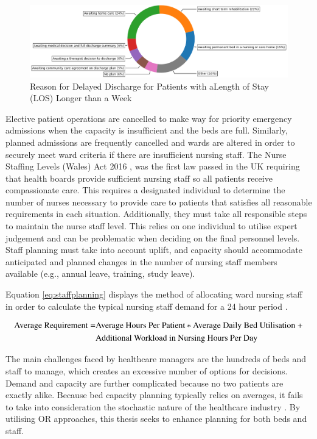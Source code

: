 \documentclass[../thesis.tex]{subfiles}
\begin{document}
\begin{figure}[h!]
    \centering
    \includegraphics[scale=0.7]{Chapters/Chapter1/Figures/piechart.png}
    \caption{Reason for Delayed Discharge for Patients with aLength of Stay (LOS) Longer than a Week \cite{NuffieldTrust2022}}
    \label{fig:Piechartdelays}
\end{figure}

Elective patient operations are cancelled to make way for priority emergency admissions when the capacity is insufficient and the beds are full. Similarly, planned admissions are frequently cancelled and wards are altered in order to securely meet ward criteria if there are insufficient nursing staff. The Nurse Staffing Levels (Wales) Act 2016 \cite{NHSAct2006}, was the first law passed in the UK requiring that health boards provide sufficient nursing staff so all patients receive compassionate care. This requires a designated individual to determine the number of nurses necessary to provide care to patients that satisfies all reasonable requirements in each situation. Additionally, they must take all responsible steps to maintain the nurse staff level. This relies on one individual to utilise expert judgement and can be problematic when deciding on the final personnel levels. Staff planning must take into account uplift, and capacity should accommodate anticipated and planned changes in the number of nursing staff members available (e.g., annual leave, training, study leave).

Equation \ref{eq:staffplanning} displays the method of allocating ward nursing staff in order to calculate the typical nursing staff demand for a 24 hour period \cite{NIHCE2014}. 

\begin{align}\label{eq:staffplanning}
    \text{Average Requirement} =& \text{Average Hours Per Patient} * \text{Average Daily Bed Utilisation } + \notag \\ &\text{Additional Workload in Nursing Hours Per Day}
\end{align}


The main challenges faced by healthcare managers are the hundreds of beds and staff to manage, which creates an excessive number of options for decisions. Demand and capacity are further complicated because no two patients are exactly alike. Because bed capacity planning typically relies on averages, it fails to take into consideration the stochastic nature of the healthcare industry \cite{Harper2002}. By utilising OR approaches, this thesis seeks to enhance planning for both beds and staff.
\end{document}

